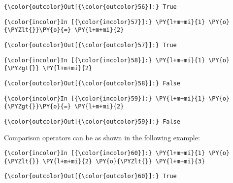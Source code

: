 \begin{Verbatim}[commandchars=\\\{\}]
{\color{outcolor}Out[{\color{outcolor}56}]:} True
\end{Verbatim}
            
\begin{Verbatim}[commandchars=\\\{\}]
{\color{incolor}In [{\color{incolor}57}]:} \PY{l+m+mi}{1} \PY{o}{\PYZlt{}}\PY{o}{=} \PY{l+m+mi}{2}
\end{Verbatim}


\begin{Verbatim}[commandchars=\\\{\}]
{\color{outcolor}Out[{\color{outcolor}57}]:} True
\end{Verbatim}
            
\begin{Verbatim}[commandchars=\\\{\}]
{\color{incolor}In [{\color{incolor}58}]:} \PY{l+m+mi}{1} \PY{o}{\PYZgt{}} \PY{l+m+mi}{2}
\end{Verbatim}


\begin{Verbatim}[commandchars=\\\{\}]
{\color{outcolor}Out[{\color{outcolor}58}]:} False
\end{Verbatim}
            
\begin{Verbatim}[commandchars=\\\{\}]
{\color{incolor}In [{\color{incolor}59}]:} \PY{l+m+mi}{1} \PY{o}{\PYZgt{}}\PY{o}{=} \PY{l+m+mi}{2}
\end{Verbatim}


\begin{Verbatim}[commandchars=\\\{\}]
{\color{outcolor}Out[{\color{outcolor}59}]:} False
\end{Verbatim}
Comparison operators can be  as shown in the following example:

\begin{Verbatim}[commandchars=\\\{\}]
{\color{incolor}In [{\color{incolor}60}]:} \PY{l+m+mi}{1} \PY{o}{\PYZlt{}} \PY{l+m+mi}{2} \PY{o}{\PYZlt{}} \PY{l+m+mi}{3}
\end{Verbatim}


\begin{Verbatim}[commandchars=\\\{\}]
{\color{outcolor}Out[{\color{outcolor}60}]:} True
\end{Verbatim}
            
